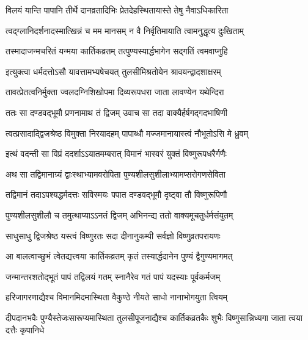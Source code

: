 


\twolineshloka
{विलयं यान्ति पापानि तीर्थे दानव्रतादिभिः}
{प्रेतदेहस्थितायास्ते तेषु नैवाऽधिकारिता} %

\twolineshloka
{त्वद्ग्लानिदर्शनादस्मात्खिन्नं च मम मानसम्}
{न वै निर्वृतिमायाति त्वामनुद्धृत्य दुःखिताम्} %

\twolineshloka
{तस्मादाजन्मचरितं यन्मया कार्तिकव्रतम्}
{तत्पुण्यस्यार्द्धभागेन सद्गतिं त्वमवाप्नुहि} %


\twolineshloka
{इत्युक्त्वा धर्मदत्तोऽसौ यावत्तामभ्यषेचयत्}
{तुलसीमिश्रतोयेन श्रावयन्द्वादशाक्षरम्} %

\twolineshloka
{तावत्प्रेतत्वनिर्मुक्ता ज्वलदग्निशिखोपमा}
{दिव्यरूपधरा जाता लावण्येन यथेन्दिरा} %

\twolineshloka
{ततः सा दण्डवद्भूमौ प्रणनामाथ तं द्विजम्}
{उवाच सा तदा वाक्यैर्हर्षगद्गदभाषिणी} %


\twolineshloka
{त्वत्प्रसादाद्द्विजश्रेष्ठ विमुक्ता निरयादहम्}
{पापाब्धौ मज्जमानायास्त्वं नौभूतोऽसि मे ध्रुवम्} %


\twolineshloka
{इत्थं वदन्ती सा विप्रं ददर्शाऽऽयातमम्बरात्}
{विमानं भास्वरं युक्तं विष्णुरूपधरैर्गणैः} %

\twolineshloka
{अथ सा तद्विमानाग्र्यं द्वाःस्थाभ्यामवरोपिता}
{पुण्यशीलसुशीलाभ्यामप्सरोगणसेविता} %

\twolineshloka
{तद्विमानं तदाऽपश्यद्धर्मदत्तः सविस्मयः}
{पपात दण्डवद्भूमौ दृष्ट्वा तौ विष्णुरूपिणौ} %

\twolineshloka
{पुण्यशीलसुशीलौ च तमुत्थाप्याऽऽनतं द्विजम्}
{अभिनन्द्य ततो वाक्यमूचतुर्धर्मसंयुतम्} %


\twolineshloka
{साधुसाधु द्विजश्रेष्ठ यस्त्वं विष्णुरतः सदा}
{दीनानुकम्पी सर्वज्ञो विष्णुव्रतपरायणः} %


\twolineshloka
{आ बालत्वाच्छुभं त्वेतद्यत्त्वया कार्तिकव्रतम्}
{कृतं तस्यार्द्धदानेन पुण्यं द्वैगुण्यमागमत्} %

\twolineshloka
{जन्मान्तरशतोद्भूतं पापं तद्विलयं गतम्}
{स्नानैरेव गतं पापं यदस्याः पूर्वकर्मजम्} %

\twolineshloka
{हरिजागरणाद्यैश्च विमानमिदमास्थिता}
{वैकुण्ठे नीयते साधो नानाभोगयुता त्वियम्} %

\threelineshloka
{दीपदानभवैः पुण्यैस्तेजःसारूप्यमास्थिता}
{तुलसीपूजनाद्यैश्च कार्तिकव्रतकैः शुभैः}
{विष्णुसान्निध्यगा जाता त्वया दत्तैः कृपानिधे} %

